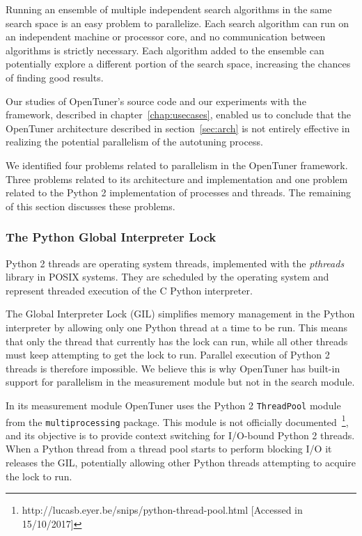 Running an ensemble of multiple independent search algorithms in the same
search space is an easy problem to parallelize. Each search algorithm can run
on an independent machine or processor core, and no communication between
algorithms is strictly necessary. Each algorithm added to the ensemble can
potentially explore a different portion of the search space, increasing the
chances of finding good results.

Our studies of OpenTuner's source code and our experiments with the framework,
described in chapter~\ref{chap:usecases}, enabled us to conclude that the
OpenTuner architecture described in section~\ref{sec:arch} is not entirely
effective in realizing the potential parallelism of the autotuning process.

We identified four problems related to parallelism in the OpenTuner framework.
Three problems related to its architecture and implementation and one
problem related to the Python 2 implementation of processes and threads.
The remaining of this section discusses these problems.

\subsubsection{The Python Global Interpreter Lock}

Python 2 threads are operating system threads, implemented with the
\textit{pthreads} library in POSIX systems. They are scheduled by the operating
system and represent threaded execution of the C Python interpreter.

The Global Interpreter Lock (GIL) simplifies memory management in the Python
interpreter by allowing only one Python thread at a time to be run.  This means
that only the thread that currently has the lock can run, while all other
threads must keep attempting to get the lock to run.  Parallel execution of
Python 2 threads is therefore impossible.  We believe this is why OpenTuner has
built-in support for parallelism in the measurement module but not in the
search module.

In its measurement module OpenTuner uses the Python 2 \texttt{ThreadPool}
module from the \texttt{multiprocessing} package.  This module is not
officially
documented~\footnote{http://lucasb.eyer.be/snips/python-thread-pool.html
[Accessed in 15/10/2017]}, and its objective is to provide context switching
for I/O-bound Python 2 threads.  When a Python thread from a thread pool starts
to perform blocking I/O it releases the GIL, potentially allowing other Python
threads attempting to acquire the lock to run.


